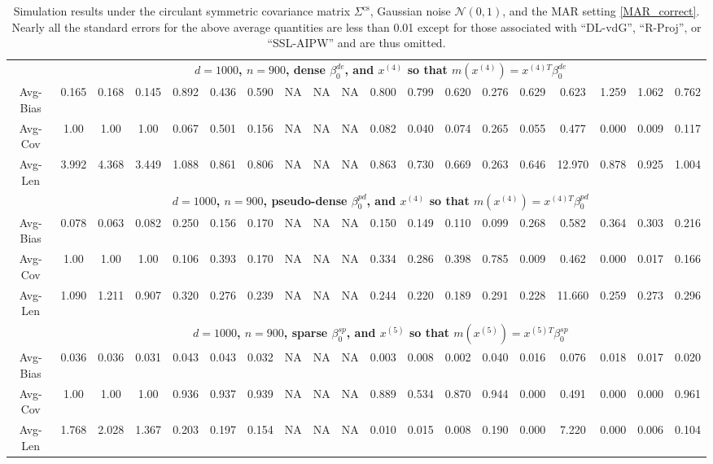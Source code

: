 \documentclass[ejsv2,noshowframe]{imsart}
\theoremstyle{plain}
\theoremstyle{definition}
\theoremstyle{remark}
\begin{document}
\begin{table}[hbtp!]
\begin{center}
{\begin{tabular}{ccccccccccccccccccc}
		& \multicolumn{18}{c}{\bf $d=1000$, $n = 900$, dense $\beta_0^{de}$, and $x^{(4)}$ so that $m(x^{(4)})=x^{(4)T}\beta_0^{de}$} \\ \cline{2-19}
		Avg-Bias & 0.165 & 0.168 & 0.145 & 0.892 & 0.436 & 0.590 & NA & NA & NA & 0.800 & 0.799 & 0.620 & 0.276 & 0.629 & 0.623 & 1.259 & 1.062 & 0.762 \\
		Avg-Cov & 1.00 & 1.00 & 1.00 & 0.067 & 0.501 & 0.156 & NA & NA & NA & 0.082 & 0.040 & 0.074 & 0.265 & 0.055 & 0.477 & 0.000 & 0.009 & 0.117 \\
		Avg-Len & 3.992 & 4.368 & 3.449 & 1.088 & 0.861 & 0.806 & NA & NA & NA & 0.863 & 0.730 & 0.669 & 0.263 & 0.646 & 12.970 & 0.878 & 0.925 & 1.004 \\
		\cline{2-19}
		
		& \multicolumn{18}{c}{\bf $d=1000$, $n = 900$, pseudo-dense $\beta_0^{pd}$, and $x^{(4)}$ so that $m(x^{(4)})=x^{(4)T}\beta_0^{pd}$} \\ \cline{2-19}
		Avg-Bias & 0.078 & 0.063 & 0.082 & 0.250 & 0.156 & 0.170 & NA & NA & NA & 0.150 & 0.149 & 0.110 & 0.099 & 0.268 & 0.582 & 0.364 & 0.303 & 0.216 \\
		Avg-Cov & 1.00 & 1.00 & 1.00 & 0.106 & 0.393 & 0.170 & NA & NA & NA & 0.334 & 0.286 & 0.398 & 0.785 & 0.009 & 0.462 & 0.000 & 0.017 & 0.166 \\
		Avg-Len & 1.090 & 1.211 & 0.907 & 0.320 & 0.276 & 0.239 & NA & NA & NA & 0.244 & 0.220 & 0.189 & 0.291 & 0.228 & 11.660 & 0.259 & 0.273 & 0.296 \\
		\hline
		
		& \multicolumn{18}{c}{\bf $d=1000$, $n = 900$, sparse $\beta_0^{sp}$, and $x^{(5)}$ so that $m(x^{(5)})=x^{(5)T}\beta_0^{sp}$} \\ \cline{2-19}
		Avg-Bias & 0.036 & 0.036 & 0.031 & 0.043 & 0.043 & 0.032 & NA & NA & NA & 0.003 & 0.008 & 0.002 & 0.040 & 0.016 & 0.076 & 0.018 & 0.017 & 0.020 \\
		Avg-Cov & 1.00 & 1.00 & 1.00 & 0.936 & 0.937 & 0.939 & NA & NA & NA & 0.889 & 0.534 & 0.870 & 0.944 & 0.000 & 0.491 & 0.000 & 0.000 & 0.961 \\
		Avg-Len & 1.768 & 2.028 & 1.367 & 0.203 & 0.197 & 0.154 & NA & NA & NA & 0.010 & 0.015 & 0.008 & 0.190 & 0.000 & 7.220 & 0.000 & 0.006 & 0.104 \\
		\hline\hline
\end{tabular}}
\caption{Simulation results under the circulant symmetric covariance matrix $\Sigma^{\mathrm{cs}}$, Gaussian noise $\mathcal{N}(0,1)$, and the MAR setting \eqref{MAR_correct}. 
	Nearly all the standard errors for the above average quantities are less than 0.01 except for those associated with ``DL-vdG'', ``R-Proj'', or ``SSL-AIPW'' and are thus omitted.}
\label{table:cirsym_MAR_res}
\end{center}
\end{table}
\end{document}
